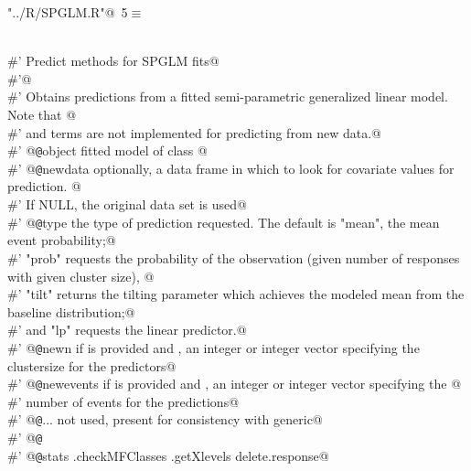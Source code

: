 \documentclass[reqno]{amsart}
\renewcommand{\NWtarget}[2]{\hypertarget{#1}{#2}}
\begin{document}
\begin{flushleft} \small\label{scrap5}\raggedright\small
\NWtarget{nuweb5}{} \verb@"../R/SPGLM.R"@\nobreak\ {\footnotesize {5}}$\equiv$
\vspace{-1ex}
\begin{list}{}{} \item
\mbox{}\verb@@\\
\mbox{}\verb@#' Predict methods for SPGLM fits@\\
\mbox{}\verb@#'@\\
\mbox{}\verb@#' Obtains predictions from a fitted semi-parametric generalized linear model. Note that @\\
\mbox{}\verb@#' and  terms are not implemented for predicting from new data.@\\
\mbox{}\verb@#' @{\tt @}\verb@param object fitted model of class @\\
\mbox{}\verb@#' @{\tt @}\verb@param newdata optionally, a data frame in which to look for covariate values for prediction. @\\
\mbox{}\verb@#'  If NULL, the original data set is used@\\
\mbox{}\verb@#' @{\tt @}\verb@param type the type of prediction requested. The default is "mean", the mean event probability;@\\
\mbox{}\verb@#' "prob" requests the probability of the observation (given number of responses with given cluster size), @\\
\mbox{}\verb@#' "tilt" returns the tilting parameter which achieves the modeled mean from the baseline distribution;@\\
\mbox{}\verb@#' and "lp" requests the linear predictor.@\\
\mbox{}\verb@#' @{\tt @}\verb@param newn if  is provided and , an integer or integer vector specifying the clustersize for the predictors@\\
\mbox{}\verb@#' @{\tt @}\verb@param newevents if  is provided and , an integer or integer vector specifying the @\\
\mbox{}\verb@#'  number of events for the predictions@\\
\mbox{}\verb@#' @{\tt @}\verb@param ... not used, present for consistency with generic@\\
\mbox{}\verb@#' @{\tt @}\verb@export@\\
\mbox{}\verb@#' @{\tt @}\verb@importFrom stats  .checkMFClasses .getXlevels delete.response@\\

\end{list}
\end{flushleft}
\end{document}
